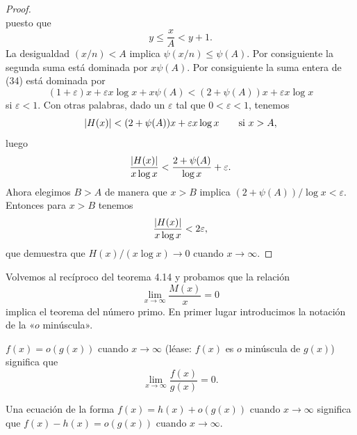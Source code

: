 \documentclass[12pt,a4paper]{book}
\begin{document}
\begin{proof}
\begin{equation*}
        \end{equation*}
        puesto que
        \begin{equation*}
            y\leq\frac{x}{A}<y+1.
        \end{equation*}
        La desigualdad $(x/n)<A$ implica $\psi(x/n)\leq\psi(A)$. Por consiguiente la
        segunda suma está dominada por $x\psi(A)$. Por consiguiente la suma entera de
        (34) está dominada por
        \begin{equation*}
            (1+\varepsilon)x+\varepsilon x\log x+x\psi(A)<(2+\psi(A))x+\varepsilon x\log x
        \end{equation*}
        si $\varepsilon<1$. Con otras palabras, dado un $\varepsilon$ tal que
        $0<\varepsilon<1$, tenemos
        \begin{equation*}
            \abs{H(x)}<(2+\psi(A))x+\varepsilon x\log x\qquad\text{si } x>A,
        \end{equation*}
        luego
        \begin{equation*}
            \frac{\abs{H(x)}}{x\log x}<\frac{2+\psi(A)}{\log x}+\varepsilon.
        \end{equation*}
        Ahora elegimos $B>A$ de manera que $x>B$ implica $(2+\psi(A))/\log x<\varepsilon$.
        Entonces para $x>B$ tenemos
        \begin{equation*}
            \frac{\abs{H(x)}}{x\log x}<2\varepsilon,
        \end{equation*}
        que demuestra que $H(x)/(x\log x)\to0$ cuando $x\to\infty$.
    \end{proof}

    Volvemos al recíproco del teorema 4.14 y probamos que la relación
    \begin{equation}
        \lim_{x\to\infty}\frac{M(x)}{x}=0
    \end{equation}
    implica el teorema del número primo. En primer lugar introducimos la
    notación de la «$o$ minúscula».

    \begin{definicion}
        $f(x)=o(g(x))$ cuando $x\to\infty$ (léase: $f(x)$ es $o$ minúscula de
        $g(x)$) significa que
        \begin{equation*}
            \lim_{x\to\infty}\frac{f(x)}{g(x)}=0.
        \end{equation*}
    \end{definicion}

    Una ecuación de la forma $f(x)=h(x)+o(g(x))$ cuando $x\to\infty$ significa que
    $f(x)-h(x)=o(g(x))$ cuando $x\to\infty$.
\end{document}
